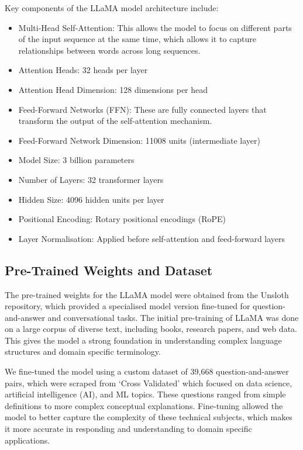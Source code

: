 \documentclass[10pt]{article}
\begin{document}
Key components of the LLaMA model architecture include:
\begin{itemize}
    \item Multi-Head Self-Attention: This allows the model to focus on different parts of the input sequence at the same time, which allows it to capture relationships between words across long sequences.
    \item Attention Heads: 32 heads per layer
    \item Attention Head Dimension: 128 dimensions per head
    \item Feed-Forward Networks (FFN): These are fully connected layers that transform the output of the self-attention mechanism.
    \item Feed-Forward Network Dimension: 11008 units (intermediate layer)
    \item Model Size: 3 billion parameters
    \item Number of Layers: 32 transformer layers
    \item Hidden Size: 4096 hidden units per layer
    \item Positional Encoding: Rotary positional encodings (RoPE)
    \item Layer Normalisation: Applied before self-attention and feed-forward layers
\end{itemize}

\subsection{Pre-Trained Weights and Dataset}

The pre-trained weights for the LLaMA model were obtained from the Unsloth repository, which
provided a specialised model version fine-tuned for question-and-answer and conversational tasks.
The initial pre-training of LLaMA was done on a large corpus of diverse text, including books,
research papers, and web data. This gives the model a strong foundation in understanding complex
language structures and domain specific terminology.

We fine-tuned the model using a custom dataset of 39,668 question-and-answer pairs, which were scraped
from `Cross Validated' which focused on data science, artificial intelligence (AI), and ML topics.
These questions ranged from simple definitions to more complex conceptual explanations. Fine-tuning allowed the
model to better capture the complexity of these technical subjects, which makes it more accurate in responding and
understanding to domain specific applications.
\end{document}
